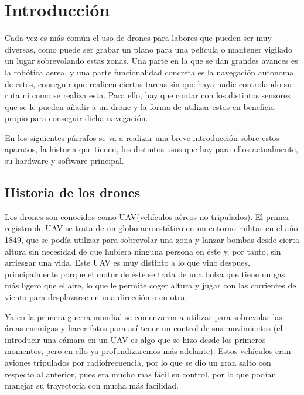\chapter{Introducci\'on}\label{cap.introduccion}
\hspace{1 cm}Cada vez es m\'as com\'un el uso de drones para labores que pueden ser muy diversas, como puede ser grabar un plano para una pel\'icula o mantener vigilado un lugar sobrevolando estas zonas. Una parte en la que se dan grandes avances es la rob\'otica aerea, y una parte funcionalidad concreta es la navegaci\'on autonoma de estos, conseguir que realicen ciertas tareas sin que haya nadie controlando su ruta ni como se realiza esta. Para ello, hay que contar con los distintos sensores que se le pueden añadir a un drone y la forma de utilizar estos en beneficio propio para conseguir dicha navegaci\'on.

\hspace{1cm} En los siguientes p\'arrafos se va a realizar una breve introducci\'on sobre estos aparatos, la historia que tienen, los distintos usos que hay para ellos actualmente, su hardware y software principal.

\section{Historia de los drones}

\hspace{1cm} Los drones son conocidos como UAV(veh\'iculos a\'ereos no tripulados). El primer registro de UAV se trata de un globo aeroest\'atico en un entorno militar en el año 1849, que se pod\'ia utilizar para sobrevolar una zona y lanzar bombas desde cierta altura sin necesidad de que hubiera ninguna persona en \'este y, por tanto, sin arriesgar una vida. Este UAV es muy distinto a lo que vino despues, principalmente porque el motor de \'este se trata de una bolsa que tiene un gas m\'as ligero que el aire, lo que le permite coger altura y jugar con las corrientes de viento para desplazarse en una direcci\'on o en otra.

\hspace{1 cm} Ya en la primera guerra mundial se comenzaron a utilizar para sobrevolar las \'areas enemigas y hacer fotos para as\'i tener un control de sus movimientos (el introducir una c\'amara en un UAV es algo que se hizo desde los primeros momentos, pero en ello ya profundizaremos m\'as adelante). Estos veh\'iculos eran aviones tripulados por radiofrecuencia, por lo que se dio un gran salto con respecto al anterior, pues era mucho mas f\'acil su control, por lo que pod\'ian manejar su trayectoria con mucha m\'as facilidad. 

